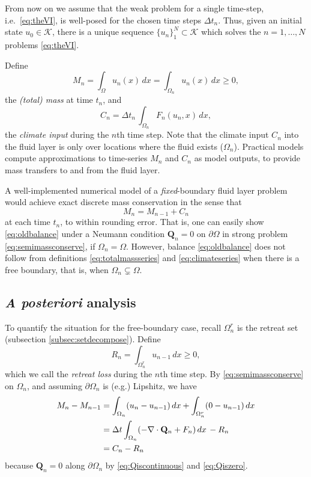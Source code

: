 \documentclass[final,leqno,onefignum,onetabnum]{siamltex1213bueler}
\newcommand\bQ{\mathbf{Q}}
\newcommand{\Div}{\nabla\cdot}
\begin{document}
From now on we assume that the weak problem for a single time-step, i.e.~\eqref{eq:theVI}, is well-posed for the chosen time steps $\Delta t_n$.  Thus, given an initial state $u_0\in\mathcal{K}$, there is a unique sequence $\{u_n\}_1^N \subset \mathcal{K}$ which solves the $n=1,\dots,N$ problems \eqref{eq:theVI}.

Define
\begin{equation}
M_n = \int_\Omega u_n(x)\,dx = \int_{\Omega_n} u_n(x)\,dx \ge 0, \label{eq:totalmassseries}
\end{equation}
the \emph{(total) mass} at time $t_n$, and
\begin{equation}
C_n = \Delta t_n\, \int_{\Omega_n} F_n(u_n,x)\,dx, \label{eq:climateseries}
\end{equation}
the \emph{climate input} during the $n$th time step.  Note that the climate input $C_n$ into the fluid layer is only over locations where the fluid exists ($\Omega_n$).  Practical models compute approximations to time-series $M_n$ and $C_n$ as model outputs, to provide mass transfers to and from the fluid layer.

A well-implemented numerical model of a \emph{fixed}-boundary fluid layer problem would achieve exact discrete mass conservation in the sense that
\begin{equation}
M_n = M_{n-1} + C_n \label{eq:oldbalance}
\end{equation}
at each time $t_n$, to within rounding error.  That is, one can easily show \eqref{eq:oldbalance} under a Neumann condition $\bQ_n=0$ on $\partial \Omega$ in strong problem \eqref{eq:semimassconserve}, if $\Omega_n=\Omega$.  However, balance \eqref{eq:oldbalance} does not follow from definitions \eqref{eq:totalmassseries} and \eqref{eq:climateseries} when there is a free boundary, that is, when $\Omega_n \subsetneq \Omega$.

\subsection{\emph{A posteriori} analysis} \label{subsec:aposteriori}  To quantify the situation for the free-boundary case, recall $\Omega_n^r$ is the retreat set (subsection \ref{subsec:setdecompose}).  Define
\begin{equation}
R_n = \int_{\Omega_n^r} u_{n-1}\,dx \ge 0, \label{eq:retreatlossseries}
\end{equation}
which we call the \emph{retreat loss} during the $n$th time step.  By \eqref{eq:semimassconserve} on $\Omega_n$, and assuming $\partial \Omega_n$ is (e.g.) Lipshitz, we have
\begin{align}
M_n - M_{n-1} &= \int_{\Omega_n} (u_n - u_{n-1})\,dx + \int_{\Omega_n^r} (0 - u_{n-1})\,dx \label{eq:newbalance} \\
   &= \Delta t \int_{\Omega_n} (- \Div \bQ_n + F_n) \,dx \, - R_n \notag \\
   &= C_n - R_n \notag
\end{align}
because $\bQ_n=0$ along $\partial \Omega_n$ by \eqref{eq:Qiscontinuous} and \eqref{eq:Qiszero}.
\end{document}
